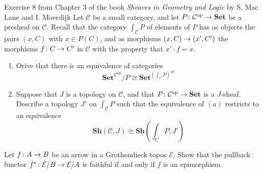 \documentclass[a4paper]{article}
\begin{document}
\begin{snippetexercise}{Exercise 8 from Chapter 3 of the book \emph{Sheaves in Geometry and Logic} by S. Mac Lane and I. Moerdijk}
    Let \(\mathcal C\) be a small category, and let \(P \colon \mathcal C^{\text{op}} \to \mathbf{Set}\)
    be a presheaf on \(\mathcal C\). Recall that the category
    \(\int_{\mathcal C} P\) of elements of \(P\) has as objects the pairs
    \((x, C)\) with \(x \in P(C)\), and as morphisms \((x, C) \to (x', C')\) the morphisms
    \(f \colon C \to C'\) in \(\mathcal C\) with the property that \(x' \cdot f = x\).
    \begin{enumerate}[label=\Alph*]
        \item Orive that there is an equivalence of categories
        \[
            \mathbf{Set}^{\mathcal C^{\text{op}}} /P \cong \mathbf{Set}^{{\left(\int_C P\right)}^{\text{op}}}
        \]
        \item Suppose that \(J\) is a topology on \(\mathcal C\), and that \(P \colon \mathcal C^{\text{op}} \to \mathbf{Set}\)
        is a \(J\)-sheaf. Describe a topology \(J'\) on \(\int_{\mathcal C} P\) such that
        the equivalence of \((a)\) restricts to an equivalence
        \[
            \mathbf{Sh}\left(
                \mathcal C, J
            \right) \cong \mathbf{Sh} \left(
                \int_C P, J'
            \right)
        \]
    \end{enumerate}
\end{snippetexercise}

\begin{snippetexercise}{}
    Let \(f\colon A \to B\) be an arrow in a Grothendieck topos \(\mathcal E\).
    Show that the pullback functor \(f^* \colon \mathcal E / B \to \mathcal E / A\) is
    faithful if and only if \(f\) is an epimorphism.
\end{snippetexercise}
\end{document}
